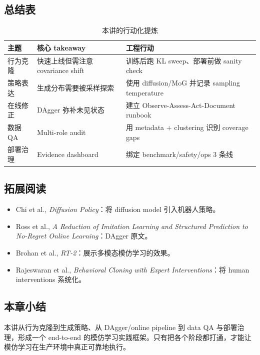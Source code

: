 \documentclass[a4paper]{article}
\begin{document}
\subsection{总结表}

\begin{table}[H]
\centering
\begin{tabular}{p{} p{} p{}}
\toprule
主题 & 核心 takeaway & 工程行动 \\
\midrule
行为克隆 & 快速上线但需注意 covariance shift & 训练后跑 KL sweep、部署前做 sanity check \\
策略表达 & 生成分布需要被采样探索 & 使用 diffusion/MoG 并记录 sampling temperature \\
在线修正 & DAgger 弥补未见状态 & 建立 Observe-Assess-Act-Document runbook \\
数据 QA & Multi-role audit & 用 metadata + clustering 识别 coverage gaps \\
部署治理 & Evidence dashboard & 绑定 benchmark/safety/ops 3 条线 \\
\bottomrule
\end{tabular}
\caption{本讲的行动化提炼}
\end{table}

\subsection{拓展阅读}
\begin{itemize}
    \item Chi et al., \textit{Diffusion Policy}：将 diffusion model 引入机器人策略。
    \item Ross et al., \textit{A Reduction of Imitation Learning and Structured Prediction to No-Regret Online Learning}：DAgger 原文。
    \item Brohan et al., \textit{RT-2}：展示多模态模仿学习的效果。
    \item Rajeswaran et al., \textit{Behavioral Cloning with Expert Interventions}：将 human interventions 系统化。
\end{itemize}

\subsection{本章小结}

本讲从行为克隆到生成策略、从 DAgger/online pipeline 到 data QA 与部署治理，形成一个 end-to-end 的模仿学习实践框架。只有把各个阶段都打通，才能让模仿学习在生产环境中真正可靠地执行。
\end{document}
